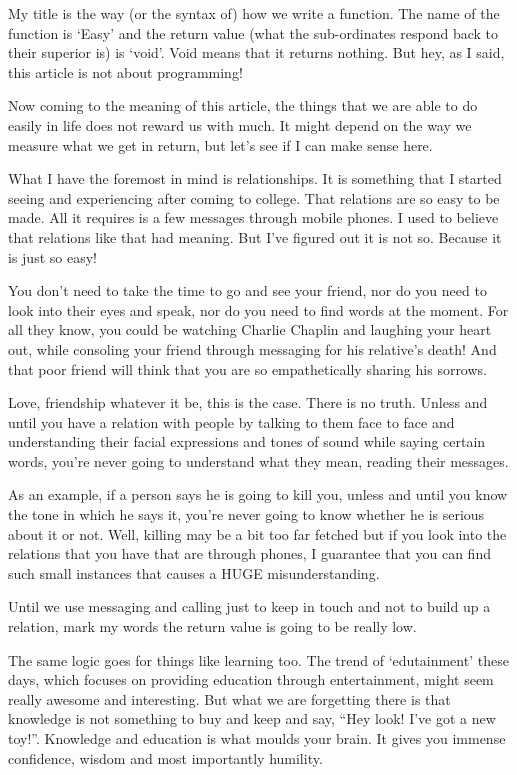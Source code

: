 \documentclass[twoside,11pt,titlepage]{article}
\begin{document}
My title is the way (or the syntax of) how we write a function. The name of the function is `Easy' and the return value (what the sub-ordinates respond back to their superior is) is `void'. Void means that it returns nothing. But hey, as I said, this article is not about programming!

Now coming to the meaning of this article, the things that we are able to do easily in life does not reward us with much. It might depend on the way we measure what we get in return, but let's see if I can make sense here.

What I have the foremost in mind is relationships. It is something that I started seeing and experiencing after coming to college. That relations are so easy to be made. All it requires is a few messages through mobile phones. I used to believe that relations like that had meaning. But I've figured out it is not so. Because it is just so easy!

You don't need to take the time to go and see your friend, nor do you need to look into their eyes and speak, nor do you need to find words at the moment. For all they know, you could be watching Charlie Chaplin and laughing your heart out, while consoling your friend through messaging for his relative's death! And that poor friend will think that you are so empathetically sharing his sorrows.

Love, friendship whatever it be, this is the case. There is no truth. Unless and until you have a relation with people by talking to them face to face and understanding their facial expressions and tones of sound while saying certain words, you're never going to understand what they mean, reading their messages.

As an example, if a person says he is going to kill you, unless and until you know the tone in which he says it, you're never going to know whether he is serious about it or not. Well, killing may be a bit too far fetched but if you look into the relations that you have that are through phones, I guarantee that you can find such small instances that causes a HUGE misunderstanding.

Until we use messaging and calling just to keep in touch and not to build up a relation, mark my words the return value is going to be really low.

The same logic goes for things like learning too. The trend of `edutainment' these days, which focuses on providing education through entertainment, might seem really awesome and interesting. But what we are forgetting there is that knowledge is not something to buy and keep and say, ``Hey look! I've got a new toy!''. Knowledge and education is what moulds your brain. It gives you immense confidence, wisdom and most importantly humility.
\end{document}
